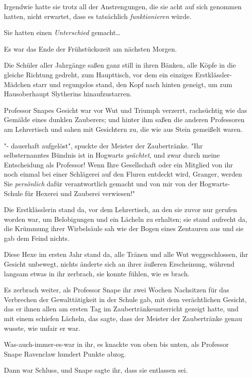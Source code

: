{Irgendwie hatte sie trotz all der Anstrengungen, die sie acht auf sich genommen hatten, nicht erwartet, dass es tatsächlich \emph{funktionieren} würde.

Sie hatten einen \emph{Unterschied} gemacht…

Es war das Ende der Frühstückszeit am nächsten Morgen.

Die Schüler aller Jahrgänge saßen ganz still in ihren Bänken, alle Köpfe in die gleiche Richtung gedreht, zum Haupttisch, vor dem ein einziges Erstklässler-Mädchen starr und regungslos stand, den Kopf nach hinten geneigt, um zum Hausoberhaupt Slytherins hinaufzustarren.

Professor Snapes Gesicht war vor Wut und Triumph verzerrt, rachsüchtig wie das Gemälde eines dunklen Zauberers; und hinter ihm saßen die anderen Professoren am Lehrertisch und sahen mit Gesichtern zu, die wie aus Stein gemeißelt waren.

"- dauerhaft aufgelöst", spuckte der Meister der Zaubertränke. "Ihr selbsternanntes Bündnis ist in Hogwarts \emph{geächtet}, und zwar durch meine Entscheidung als Professor! Wenn Ihre Gesellschaft oder ein Mitglied von ihr noch einmal bei einer Schlägerei auf den Fluren entdeckt wird, Granger, werden Sie \emph{persönlich} dafür verantwortlich gemacht und von mir von der Hogwarts-Schule für Hexerei und Zauberei verwiesen!"

Die Erstklässlerin stand da, vor dem Lehrertisch, an den sie zuvor nur gerufen worden war, um Belobigungen und ein Lächeln zu erhalten; sie stand aufrecht da, die Krümmung ihrer Wirbelsäule sah wie der Bogen eines Zentauren aus und sie gab dem Feind nichts.

Diese Hexe im ersten Jahr stand da, alle Tränen und alle Wut weggeschlossen, ihr Gesicht unbewegt, nichts änderte sich an ihrer äußeren Erscheinung, während langsam etwas in ihr zerbrach, sie konnte fühlen, wie es brach.

Es zerbrach weiter, als Professor Snape ihr zwei Wochen Nachsitzen für das Verbrechen der Gewalttätigkeit in der Schule gab, mit dem verächtlichen Gesicht, das er ihnen allen am ersten Tag im Zaubertränkeunterricht gezeigt hatte, und mit einem schiefen Lächeln, das sagte, dass der Meister der Zaubertränke genau wusste, wie unfair er war.

Was-auch-immer-es-war in ihr, es knackte von oben bis unten, als Professor Snape Ravenclaw hundert Punkte abzog.

Dann war Schluss, und Snape sagte ihr, dass sie entlassen sei.

}
